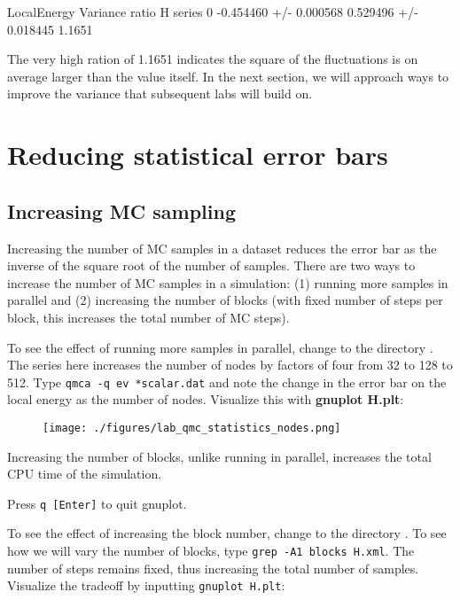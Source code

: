 \begin{shade}
                     LocalEnergy               Variance        ratio
H  series 0  -0.454460 +/- 0.000568   0.529496 +/- 0.018445   1.1651
\end{shade}

The very high ration of 1.1651 indicates the square of the fluctuations is on
average larger than the value itself.  In the next section, we will approach
ways to improve the variance that subsequent labs will build on.  

\section{Reducing statistical error bars}

\subsection{Increasing MC sampling}

Increasing the number of MC samples in a dataset reduces the error bar as the
inverse of the square root of the number of samples.  There are two ways to
increase the number of MC samples in a simulation: (1) running more samples in
parallel and (2) increasing the number of blocks (with fixed number of steps per
block, this increases the total number of MC steps).

To see the effect of running more samples in parallel, change to the
directory .  The series here increases the number of nodes by
factors of four from 32 to 128 to 512.  Type \texttt{qmca -q ev *scalar.dat}
and note the change in the error bar on the local energy as the number of
nodes.  Visualize this with \textbf{gnuplot H.plt}:

\FloatBarrier
\begin{figure}[ht!]
\begin{center}
\texttt{[image: ./figures/lab\_qmc\_statistics\_nodes.png]}
\end{center}
\end{figure}
\FloatBarrier


Increasing the number of blocks, unlike running in parallel, increases the
total CPU time of the simulation.  

Press \texttt{q [Enter]} to quit gnuplot.

To see the effect of increasing the block number, change to the directory
. To see how we will vary the number of blocks, type
\texttt{grep -A1 blocks H.xml}.  The number of steps remains fixed, thus
increasing the total number of samples.   Visualize the tradeoff by inputting
\texttt{gnuplot H.plt}: 

